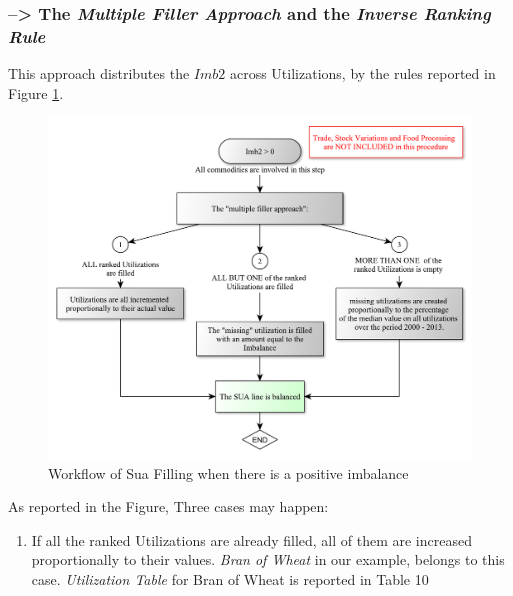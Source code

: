 \documentclass[]{article}
\providecommand{\tightlist}{%
  \setlength{\itemsep}{0pt}\setlength{\parskip}{0pt}}
\begin{document}
\subsubsection*{\texorpdfstring{--\textgreater{} The \emph{Multiple
Filler Approach} and the \emph{Inverse Ranking
Rule}}{--\textgreater{} The Multiple Filler Approach and the Inverse Ranking Rule}}\label{the-multiple-filler-approach-and-the-inverse-ranking-rule}

This approach distributes the \(Imb2\) across Utilizations, by the rules
reported in Figure \ref{fig:f7}.

\begin{figure}

{\centering \includegraphics{images/StandBal/07b_PositiveImbalance} 

}

\caption{\label{fig:f5}Workflow of Sua Filling when there is a positive imbalance}\label{fig:f7}
\end{figure}

As reported in the Figure, Three cases may happen:

\begin{enumerate}
\def\labelenumi{\arabic{enumi}.}
\tightlist
\item
  If all the ranked Utilizations are already filled, all of them are
  increased proportionally to their values. \emph{Bran of Wheat} in our
  example, belongs to this case. \emph{Utilization Table} for Bran of
  Wheat is reported in Table 10
\end{enumerate}
\end{document}
